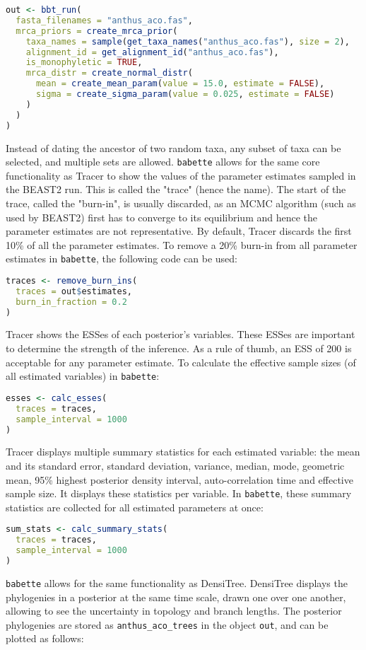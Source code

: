 \documentclass{article}
\begin{document}
\begin{lstlisting}[language=R, floatplacement=H]
out <- bbt_run(
  fasta_filenames = "anthus_aco.fas",
  mrca_priors = create_mrca_prior(
    taxa_names = sample(get_taxa_names("anthus_aco.fas"), size = 2),
    alignment_id = get_alignment_id("anthus_aco.fas"),
    is_monophyletic = TRUE,
    mrca_distr = create_normal_distr(
      mean = create_mean_param(value = 15.0, estimate = FALSE),
      sigma = create_sigma_param(value = 0.025, estimate = FALSE)
    )
  )
)
\end{lstlisting}
Instead of dating the ancestor of two random taxa, any subset of taxa can be selected,
and multiple sets are allowed.
\verb;babette; allows for the same core functionality as Tracer to show the values of the parameter estimates sampled
in the BEAST2 run. This is called the "trace" (hence the name).
The start of the trace, called the "burn-in", is usually discarded, as an MCMC 
algorithm (such as used by BEAST2) first has to converge to
its equilibrium and hence the parameter estimates are not 
representative. By default, Tracer discards the first 10\% of all 
the parameter estimates. 
To remove a 20\% burn-in from all parameter estimates 
in \verb;babette;, the following code can be used:

\begin{lstlisting}[language=R, floatplacement=H]
traces <- remove_burn_ins(
  traces = out$estimates, 
  burn_in_fraction = 0.2
)
\end{lstlisting}
Tracer shows the ESSes of each posterior's variables.
These ESSes are important to determine the strength of the
inference. As a rule of thumb, an ESS of 200 is acceptable 
for any parameter estimate.
To calculate the effective sample sizes (of all estimated variables) in \verb;babette;:

\begin{lstlisting}[language=R, floatplacement=H]
esses <- calc_esses(
  traces = traces, 
  sample_interval = 1000
)
\end{lstlisting}
Tracer displays multiple summary statistics for each
estimated variable: the mean and its standard error, standard deviation,
variance, median, mode, geometric mean, 95\% highest posterior density interval, 
auto-correlation time and effective sample size. It displays these statistics per
variable. In \verb;babette;, these summary statistics are collected for
all estimated parameters at once: 

\begin{lstlisting}[language=R, floatplacement=H]
sum_stats <- calc_summary_stats(
  traces = traces, 
  sample_interval = 1000
)
\end{lstlisting}
\verb;babette; allows for the same functionality as DensiTree.
DensiTree displays the phylogenies in a posterior at the same
time scale, drawn one over one another, allowing to see the uncertainty in
topology and branch lengths. 
The posterior phylogenies are stored as \verb;anthus_aco_trees; in the object \verb;out;,
and can be plotted as follows:
\end{document}
